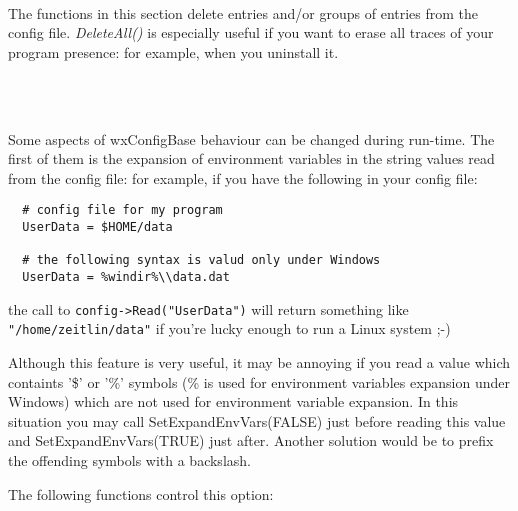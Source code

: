 \\


The functions in this section delete entries and/or groups of entries from the
config file. {\it DeleteAll()} is especially useful if you want to erase all
traces of your program presence: for example, when you uninstall it.

\\
\\


Some aspects of wxConfigBase behaviour can be changed during run-time. The
first of them is the expansion of environment variables in the string values
read from the config file: for example, if you have the following in your
config file:

\begin{verbatim}
  # config file for my program
  UserData = $HOME/data

  # the following syntax is valud only under Windows
  UserData = %windir%\\data.dat
\end{verbatim}
the call to {\tt config->Read("UserData")} will return something like
{\tt "/home/zeitlin/data"} if you're lucky enough to run a Linux system ;-)

Although this feature is very useful, it may be annoying if you read a value
which containts '\$' or '\%' symbols (\% is used for environment variables
expansion under Windows) which are not used for environment variable
expansion. In this situation you may call SetExpandEnvVars(FALSE) just before
reading this value and SetExpandEnvVars(TRUE) just after. Another solution
would be to prefix the offending symbols with a backslash.

The following functions control this option:

\\
\\
\\

